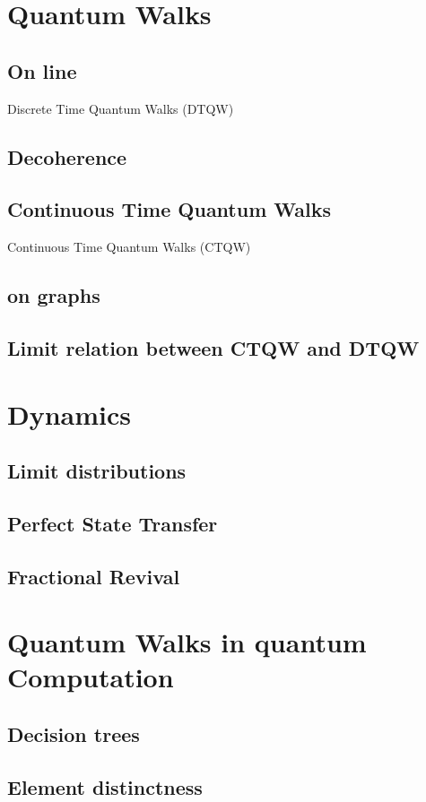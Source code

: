 \documentclass[journal, a4paper]{IEEEtran}
\begin{document}
\section{Quantum Walks}
\subsection{On line}
Discrete Time Quantum Walks (DTQW)
\subsection{Decoherence}
\subsection{Continuous Time Quantum Walks}
Continuous Time Quantum Walks (CTQW)
\subsection{on graphs}
\subsection{Limit relation between CTQW and DTQW}

\section{Dynamics}
\subsection{Limit distributions}
\subsection{Perfect State Transfer}
\subsection{Fractional Revival}

\section{Quantum Walks in quantum Computation}
\subsection{Decision trees}
\subsection{Element distinctness}
\end{document}
